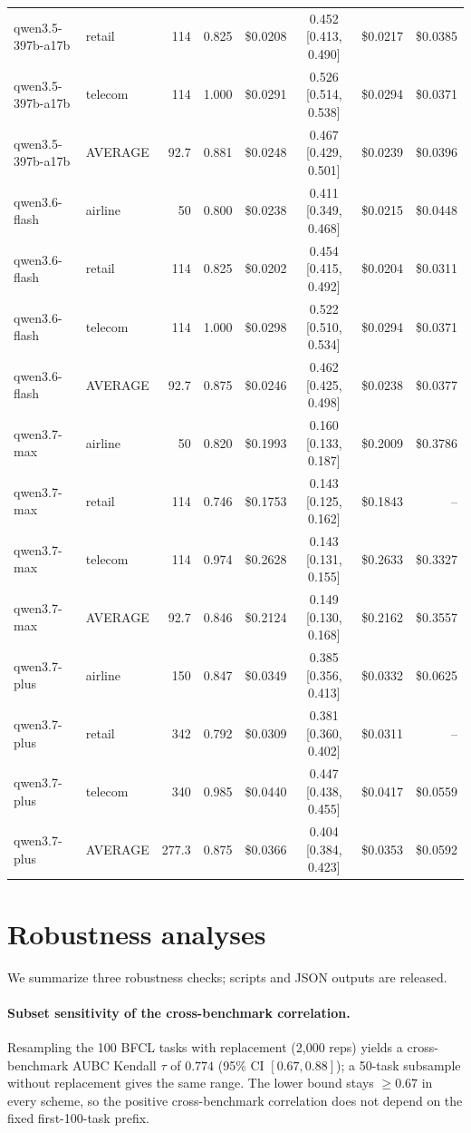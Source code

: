 \documentclass[preprint,authoryear,12pt]{elsarticle}
\begin{document}
\begin{table}[h]
{\begin{tabular}{l l r r r c r r}
qwen3.5-397b-a17b & retail & 114 & 0.825 & \$0.0208 & 0.452 [0.413, 0.490] & \$0.0217 & \$0.0385 \\
qwen3.5-397b-a17b & telecom & 114 & 1.000 & \$0.0291 & 0.526 [0.514, 0.538] & \$0.0294 & \$0.0371 \\
qwen3.5-397b-a17b & AVERAGE & 92.7 & 0.881 & \$0.0248 & 0.467 [0.429, 0.501] & \$0.0239 & \$0.0396 \\
\midrule
qwen3.6-flash & airline & 50 & 0.800 & \$0.0238 & 0.411 [0.349, 0.468] & \$0.0215 & \$0.0448 \\
qwen3.6-flash & retail & 114 & 0.825 & \$0.0202 & 0.454 [0.415, 0.492] & \$0.0204 & \$0.0311 \\
qwen3.6-flash & telecom & 114 & 1.000 & \$0.0298 & 0.522 [0.510, 0.534] & \$0.0294 & \$0.0371 \\
qwen3.6-flash & AVERAGE & 92.7 & 0.875 & \$0.0246 & 0.462 [0.425, 0.498] & \$0.0238 & \$0.0377 \\
\midrule
qwen3.7-max & airline & 50 & 0.820 & \$0.1993 & 0.160 [0.133, 0.187] & \$0.2009 & \$0.3786 \\
qwen3.7-max & retail & 114 & 0.746 & \$0.1753 & 0.143 [0.125, 0.162] & \$0.1843 & -- \\
qwen3.7-max & telecom & 114 & 0.974 & \$0.2628 & 0.143 [0.131, 0.155] & \$0.2633 & \$0.3327 \\
qwen3.7-max & AVERAGE & 92.7 & 0.846 & \$0.2124 & 0.149 [0.130, 0.168] & \$0.2162 & \$0.3557 \\
\midrule
qwen3.7-plus & airline & 150 & 0.847 & \$0.0349 & 0.385 [0.356, 0.413] & \$0.0332 & \$0.0625 \\
qwen3.7-plus & retail & 342 & 0.792 & \$0.0309 & 0.381 [0.360, 0.402] & \$0.0311 & -- \\
qwen3.7-plus & telecom & 340 & 0.985 & \$0.0440 & 0.447 [0.438, 0.455] & \$0.0417 & \$0.0559 \\
qwen3.7-plus & AVERAGE & 277.3 & 0.875 & \$0.0366 & 0.404 [0.384, 0.423] & \$0.0353 & \$0.0592 \\
\bottomrule
\end{tabular}%
}
\end{table}


\section{Robustness analyses}
\label{app:robust}
We summarize three robustness checks; scripts and JSON outputs are released.

\paragraph{Subset sensitivity of the cross-benchmark correlation.} Resampling the 100 BFCL tasks with replacement (2{,}000 reps) yields a cross-benchmark AUBC Kendall $\tau$ of $0.774$ (95\% CI $[0.67, 0.88]$); a 50-task subsample without replacement gives the same range. The lower bound stays $\geq 0.67$ in every scheme, so the positive cross-benchmark correlation does not depend on the fixed first-100-task prefix.
\end{document}

